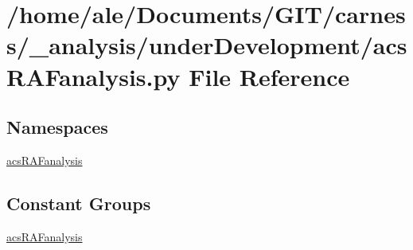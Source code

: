 \hypertarget{a00038}{\section{/home/ale/\-Documents/\-G\-I\-T/carness/\-\_\-analysis/under\-Development/acs\-R\-A\-Fanalysis.py File Reference}
\label{a00038}
}
\subsection*{Namespaces}
\begin{DoxyCompactItemize}
\item 
\hyperlink{a00095}{acs\-R\-A\-Fanalysis}
\end{DoxyCompactItemize}
\subsection*{Constant Groups}
\begin{DoxyCompactItemize}
\item 
\hyperlink{a00095}{acs\-R\-A\-Fanalysis}
\end{DoxyCompactItemize}

